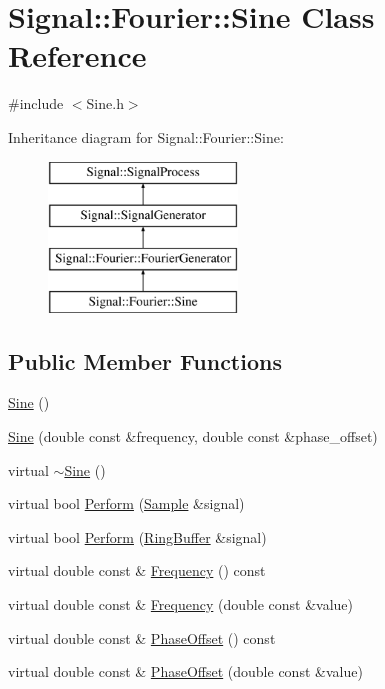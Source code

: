 \hypertarget{classSignal_1_1Fourier_1_1Sine}{\section{Signal\+:\+:Fourier\+:\+:Sine Class Reference}
\label{classSignal_1_1Fourier_1_1Sine}
}


{\ttfamily \#include $<$Sine.\+h$>$}

Inheritance diagram for Signal\+:\+:Fourier\+:\+:Sine\+:\begin{figure}[H]
\begin{center}
\leavevmode
\includegraphics[height=4.000000cm]{classSignal_1_1Fourier_1_1Sine}
\end{center}
\end{figure}
\subsection*{Public Member Functions}
\begin{DoxyCompactItemize}
\item 
\hyperlink{classSignal_1_1Fourier_1_1Sine_a432f8893c0b3c5a103009f8ad0e520e5}{Sine} ()
\item 
\hyperlink{classSignal_1_1Fourier_1_1Sine_a70dc360d7d6d64a249e3840547d251fb}{Sine} (double const \&frequency, double const \&phase\+\_\+offset)
\item 
virtual \hyperlink{classSignal_1_1Fourier_1_1Sine_abc5739e46fb95ff443948bf990575f26}{$\sim$\+Sine} ()
\item 
virtual bool \hyperlink{classSignal_1_1Fourier_1_1Sine_aa35c77904f8d7a0de6fa4895d6c53644}{Perform} (\hyperlink{classSignal_1_1Sample}{Sample} \&signal)
\item 
virtual bool \hyperlink{classSignal_1_1Fourier_1_1Sine_a5d951e5fbfc77354bddab9dfedea008f}{Perform} (\hyperlink{classSignal_1_1RingBuffer}{Ring\+Buffer} \&signal)
\item 
virtual double const \& \hyperlink{classSignal_1_1SignalGenerator_a96af42ee68f94e9b04d034fd68b73ecd}{Frequency} () const 
\item 
virtual double const \& \hyperlink{classSignal_1_1SignalGenerator_af83b532bf3ddc3637c2fd7a1dfd095cb}{Frequency} (double const \&value)
\item 
virtual double const \& \hyperlink{classSignal_1_1SignalGenerator_ac2538ec946f001e394d2416fda698d1c}{Phase\+Offset} () const 
\item 
virtual double const \& \hyperlink{classSignal_1_1SignalGenerator_ac6a103ff72beaa338f6d18c812522d78}{Phase\+Offset} (double const \&value)
\end{DoxyCompactItemize}
